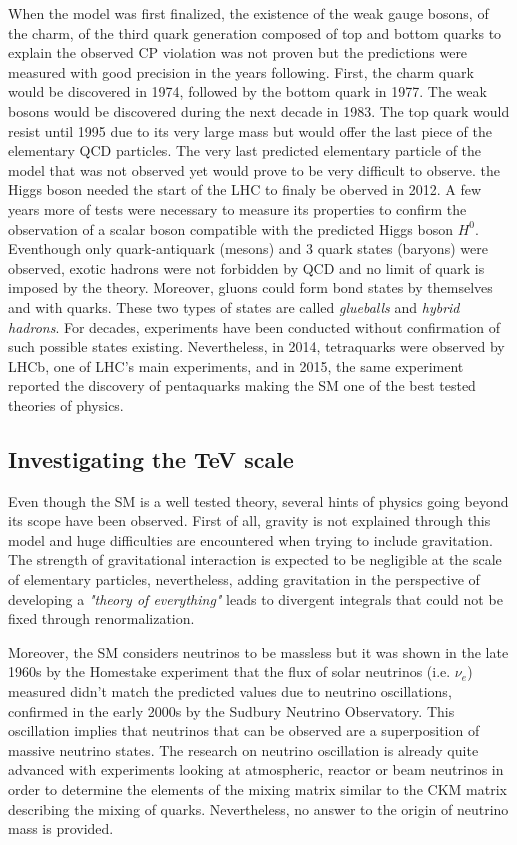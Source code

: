 	When the model was first finalized, the existence of the weak gauge bosons, of the charm, of the third quark generation composed of top and bottom quarks to explain the observed CP violation was not proven but the predictions were measured with good precision in the years following. First, the charm quark would be discovered in 1974, followed by the bottom quark in 1977. The weak bosons would be discovered during the next decade in 1983. The top quark would resist until 1995 due to its very large mass but would offer the last piece of the elementary QCD particles. The very last predicted elementary particle of the model that was not observed yet would prove to be very difficult to observe. the Higgs boson needed the start of the LHC to finaly be oberved in 2012. A few years more of tests were necessary to measure its properties to confirm the observation of a scalar boson compatible with the predicted Higgs boson $H^0$. Eventhough only quark-antiquark (mesons) and 3 quark states (baryons) were observed, exotic hadrons were not forbidden by QCD and no limit of quark is imposed by the theory. Moreover, gluons could form bond states by themselves and with quarks. These two types of states are called \textit{glueballs} and \textit{hybrid hadrons}. For decades, experiments have been conducted without confirmation of such possible states existing. Nevertheless, in 2014, tetraquarks were observed by LHCb, one of LHC's main experiments, and in 2015, the same experiment reported the discovery of pentaquarks making the SM one of the best tested theories of physics.
	
	\subsection{Investigating the TeV scale}
	\label{chapt2:ssec:TeV}
	
	Even though the SM is a well tested theory, several hints of physics going beyond its scope have been observed. First of all, gravity is not explained through this model and huge difficulties are encountered when trying to include gravitation. The strength of gravitational interaction is expected to be negligible at the scale of elementary particles, nevertheless, adding gravitation in the perspective of developing a \textit{"theory of everything"} leads to divergent integrals that could not be fixed through renormalization.
	
	Moreover, the SM considers neutrinos to be massless but it was shown in the late 1960s by the Homestake experiment that the flux of solar neutrinos (i.e. $\nu_e$) measured didn't match the predicted values due to neutrino oscillations, confirmed in the early 2000s by the Sudbury Neutrino Observatory. This oscillation implies that neutrinos that can be observed are a superposition of massive neutrino states. The research on neutrino oscillation is already quite advanced with experiments looking at atmospheric, reactor or beam neutrinos in order to determine the elements of the mixing matrix similar to the CKM matrix describing the mixing of quarks. Nevertheless, no answer to the origin of neutrino mass is provided.
	
